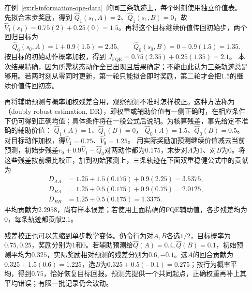 \begin{example}[在同一日志上完成FQE与DR]
  \label{ex:rl-information-fqe-dr}
  在例~\ref{ex:rl-information-ope-data}~的同三条轨迹上，每个时刻使用独立价值表。先拟合末步奖励，得到
  $\widehat Q_1(s_1,A)=2$、$\widehat Q_1(s_1,B)=0$，故
  $\widehat V_1(s_1)=0.75(2)+0.25(0)=1.5$。再将这个目标继续价值传回初始步，两个回归目标为
  \[
    \widehat Q_0(s_0,A)=1+0.9(1.5)=2.35,\qquad
    \widehat Q_0(s_0,B)=0+0.9(1.5)=1.35.
  \]
  按目标的初始动作概率加权，得到
  $\widehat J_{\mathrm{FQE}}=0.75(2.35)+0.25(1.35)=2.1$。
  本次结果精确，因为所需状态动作全已出现且后果确定；不能由此认为三条轨迹总是够用。若两时刻从零同时更新，第一轮只能拟合即时奖励，第二轮才会把1.5的继续价值传回初态。

  再将辅助预测与概率加权残差合用，观察预测不准时怎样校正。这种方法称为（doubly robust estimation, DR），即权重或辅助价值有一侧正确时，在相应条件下仍可得到正确均值；具体条件将在一般公式后说明。为核算残差，事先给定不准确的辅助价值：
  $\widehat Q_1(A)=1$、$\widehat Q_1(B)=0$，
  $\widehat Q_0(A)=1.5$、$\widehat Q_0(B)=0.5$。
  对目标动作加权，得$\widehat V_1=0.75$、$\widehat V_0=1.25$。
  用实际奖励加预测继续价值减去当前预测，初始步残差$r_0+0.9\widehat V_1-\widehat Q_0$对两动作都为0.175，末步对$A$为1、对$B$为0。将这些残差按前缀比校正，加到初始预测上，三条轨迹在下面双重稳健公式中的贡献为
  \[
  \begin{aligned}
    D_{AA}&=1.25+1.5(0.175)+0.9(2.25)=3.5375,\\
    D_{BA}&=1.25+0.5(0.175)+0.9(0.75)=2.0125,\\
    D_{BB}&=1.25+0.5(0.175)=1.3375.
  \end{aligned}
  \]
  平均贡献为$2.2958$，尚有样本误差；若使用上面精确的FQE辅助值，各步残差均为0，每条轨迹都贡献2.1。
\end{example}

残差校正也可以先缩到单步教学变体。仍令行为对$A,B$各选$1/2$，目标概率为$0.75,0.25$，奖励分别为1和0。若辅助预测给$\widehat Q(A)=0.4,\widehat Q(B)=0.1$，初始预测平均为$0.325$，实际奖励相对预测的残差分别为$0.6,-0.1$。选$A$的回合贡献为$0.325+1.5(0.6)=1.225$，选$B$为$0.325+0.5(-0.1)=0.275$；按行为概率平均，得到$0.75$，恰好恢复目标回报。预测先提供一个共同起点，正确权重再补上其平均错误；有限一批记录仍会波动。


